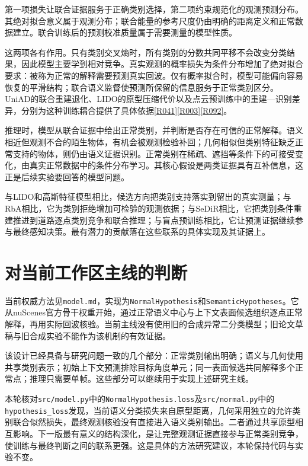 \documentclass[11pt,a4paper]{article}
\newcommand{\paper}[1]{\allowbreak\hyperlink{#1}{[#1]}\allowbreak}
\begin{document}
第一项损失让联合证据服务于正确类别选择，第二项约束规范化的观测预测分布。其绝对拟合意义属于观测分布；联合能量的参考尺度仍由明确的距离定义和正常数据建立。联合训练后的预测校准质量属于需要测量的模型性质。

这两项各有作用。只有类别交叉熵时，所有类别的分数共同平移不会改变分类结果，因此模型主要学到相对竞争。真实观测的概率损失为条件分布增加了绝对拟合要求：被称为正常的解释需要预测真实回波。仅有概率拟合时，模型可能偏向容易恢复的平滑结构；联合语义监督使预测所保留的信息服务于正常类别区分。UniAD的联合重建退化、LIDO的原型压缩代价以及点云预训练中的重建—识别差异，分别为这种训练耦合提供了具体依据\paper{R041}\paper{R003}\paper{R092}。

推理时，模型从联合证据中给出正常类别，并判断是否存在可信的正常解释。语义相近但观测不合的陌生物体，有机会被观测检验补回；几何相似但类别特征缺乏正常支持的物体，则仍由语义证据识别。正常类别在稀疏、遮挡等条件下的可接受变化，由真实正常数据中的条件分布学习。其核心假设是两类证据具有互补信息，这正是后续实验要回答的模型问题。

与LIDO和高斯特征模型相比，候选方向把类别支持落实到留出的真实测量；与RbA相比，它为类别拒绝增加可检验的观测依据；与SeDiR相比，它把类别条件重建推进到道路逐点类别竞争和联合推理；与盲点预训练相比，它让预测证据继续参与最终感知决策。最有潜力的贡献落在这些联系的具体实现及其证据上。

\section{对当前工作区主线的判断}

当前权威方法见\texttt{model.md}，实现为\texttt{NormalHypothesis}和\texttt{SemanticHypotheses}。它从nuScenes官方骨干权重开始，通过正常语义中心与上下文表面候选组织逐点正常解释，再用实际回波核验。当前主线没有使用旧的合成异常二分类模型；旧论文草稿与旧合成实验不能作为该机制的有效证据。

该设计已经具备与研究问题一致的几个部分：正常类别输出明确；语义与几何使用共享类别表示；初始上下文预测排除目标角度单元；同一表面候选共同解释多个正常点；推理只需要单帧。这些部分可以继续用于实现上述研究主线。

本轮核对\texttt{src/model.py}中的\texttt{NormalHypothesis.loss}及\texttt{src/normal.py}中的\texttt{hypothesis\_loss}发现，当前语义分类损失来自原型距离，几何采用独立的允许类别联合似然损失，最终观测核验没有直接进入语义类别输出。二者通过共享原型相互影响。下一版最有意义的结构深化，是让完整观测证据直接参与正常类别竞争，使训练与最终判断之间的联系更强。这是具体的方法研究建议，本轮保持代码与实验不变。
\end{document}
